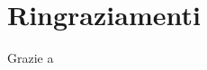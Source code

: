 \documentclass[../main.tex]{subfiles}
\begin{document}
\chapter*{Ringraziamenti}

Grazie a 
\end{document}
